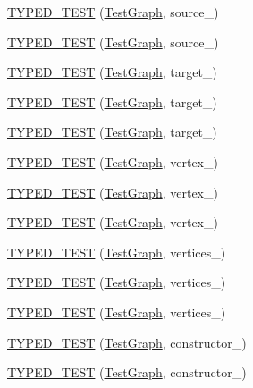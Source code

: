 \begin{DoxyCompactItemize}
\item 
\hyperlink{TestGraph_8c_09_09_a7d3363f4d6c52571fadda44674aec77e}{T\-Y\-P\-E\-D\-\_\-\-T\-E\-S\-T} (\hyperlink{structTestGraph}{Test\-Graph}, source\-\_)
\item 
\hyperlink{TestGraph_8c_09_09_aa5dcf214c2d72e66980984f8683d5f51}{T\-Y\-P\-E\-D\-\_\-\-T\-E\-S\-T} (\hyperlink{structTestGraph}{Test\-Graph}, source\-\_)
\item 
\hyperlink{TestGraph_8c_09_09_a7ddc1d9ef8cc196aaad7d311559ff7d6}{T\-Y\-P\-E\-D\-\_\-\-T\-E\-S\-T} (\hyperlink{structTestGraph}{Test\-Graph}, target\-\_)
\item 
\hyperlink{TestGraph_8c_09_09_aebbe5b19d3d08ea67d41407013c68730}{T\-Y\-P\-E\-D\-\_\-\-T\-E\-S\-T} (\hyperlink{structTestGraph}{Test\-Graph}, target\-\_)
\item 
\hyperlink{TestGraph_8c_09_09_a70a2ce9b52f75a14f93d3578a5da6eb3}{T\-Y\-P\-E\-D\-\_\-\-T\-E\-S\-T} (\hyperlink{structTestGraph}{Test\-Graph}, target\-\_)
\item 
\hyperlink{TestGraph_8c_09_09_a7d1dcfb2ea67c0d7f50542e69c6d2822}{T\-Y\-P\-E\-D\-\_\-\-T\-E\-S\-T} (\hyperlink{structTestGraph}{Test\-Graph}, vertex\-\_)
\item 
\hyperlink{TestGraph_8c_09_09_a6332eae99dce8de9ea880f7765b9936d}{T\-Y\-P\-E\-D\-\_\-\-T\-E\-S\-T} (\hyperlink{structTestGraph}{Test\-Graph}, vertex\-\_)
\item 
\hyperlink{TestGraph_8c_09_09_af1ebb553dde33bf2791f69dc0bc4fc18}{T\-Y\-P\-E\-D\-\_\-\-T\-E\-S\-T} (\hyperlink{structTestGraph}{Test\-Graph}, vertex\-\_)
\item 
\hyperlink{TestGraph_8c_09_09_a2124e1f4ee8757af5339965a3334870b}{T\-Y\-P\-E\-D\-\_\-\-T\-E\-S\-T} (\hyperlink{structTestGraph}{Test\-Graph}, vertices\-\_)
\item 
\hyperlink{TestGraph_8c_09_09_a427a2ce02293c7a4a6a737a909fb02ab}{T\-Y\-P\-E\-D\-\_\-\-T\-E\-S\-T} (\hyperlink{structTestGraph}{Test\-Graph}, vertices\-\_)
\item 
\hyperlink{TestGraph_8c_09_09_a2f5f39f924c6da4fbcfea85cdefe748d}{T\-Y\-P\-E\-D\-\_\-\-T\-E\-S\-T} (\hyperlink{structTestGraph}{Test\-Graph}, vertices\-\_)
\item 
\hyperlink{TestGraph_8c_09_09_a81fb7ad1df37e5d1fc4747bd056c971b}{T\-Y\-P\-E\-D\-\_\-\-T\-E\-S\-T} (\hyperlink{structTestGraph}{Test\-Graph}, constructor\-\_)
\item 
\hyperlink{TestGraph_8c_09_09_a30c7f279598e0e14a1625ed11f655aad}{T\-Y\-P\-E\-D\-\_\-\-T\-E\-S\-T} (\hyperlink{structTestGraph}{Test\-Graph}, constructor\-\_)

\end{DoxyCompactItemize}
